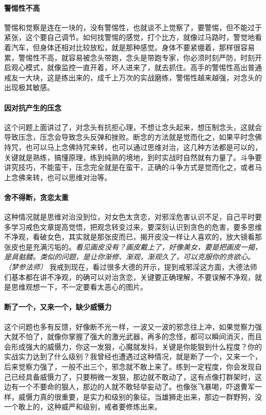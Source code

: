 \paragraph{警惕性不高}

警惕和觉察是连在一块的，没有警惕性，也就谈不上觉察了，要警惕，但不能过于紧张，这个要自己调节。如何找警惕的感觉，打个比方，就像过马路时，警觉地看着汽车，但身体还相对比较放松，就是那种感觉。身体不要紧绷着，那样很容易累，警惕性不高，就容易被念头带跑，念头是带跑专家，你必须时刻严防，时刻开启观心模式，就像监控一直开着，坏人进来了，就去抓住。高手的警惕性高出普通戒友一大块，这是练出来的，成千上万次的实战磨练，警惕性越来越强，对念头的出现极其敏感。

\paragraph{因对抗产生的压念}

这个问题上面讲过了，对念头有抗拒心理，不想让念头起来，想压制念头，这就会导致压念，压念会导致念头反弹和挫败。断念的方法就是觉而化之，如果平时念佛持咒，也可以马上念佛持咒来转，也可以通过思维对治，这几种方法都是可以的，关键就是熟练，搞懂原理，练到纯熟的境地，到时实战时自然就有力量了。斗争要讲究技巧，不能蛮干，压念完全就是在蛮干，正确的斗争方式是觉而化之，或者马上念佛来转，也可以思维对治等。

\paragraph{舍不得断，贪恋太重}

这种情况就是思维对治没到位，对女色太贪恋，对邪淫危害认识不足，自己平时要多学习戒色文章提高觉悟，把观念转变过来，要深刻认识到贪色的危害，要多思维不净观，看破女色，其实就是那张皮而已，揭开皮没一样让人喜欢的，放大镜看那张皮也是充满污垢的。\textit{看见画皮没有？画皮戴上了，好像美女，要是把画皮一揭，是具骷髅。类似的问题，是让你渐修、渐观，渐观久了，可以克服你的贪欲心。（梦参法师）} 我戒到现在，看过很多大德的开示，提到戒邪淫这方面，大德法师们基本都在讲不净观，的确可以对治贪恋，关键要正确理解，不要误解不净观，就是思维观想一下，不一定要看太恶心的图片。

\paragraph{断了一个，又来一个，缺少威慑力}

这个问题也多有反馈，好像断不光一样，一波又一波的邪念往上冲，如果觉察力强大就不怕了，就像你掌握了强大的激光武器，再多的念怪，都可以瞬间消灭，而且会形成强大的威慑力，你这一发狠，心魔就发抖，关键是你能狠到什么程度？你的实战实力达到了什么级别？我曾经也遭遇过这种情况，就是断了一个，又来一个，后来觉察力强了，一般不出三个，邪念就不敢上来了。练到一定程度，你会发现自己已经具备威慑力了，只要稍微一发狠，那边就不敢动了，这有点像打群架时，这边有一个不要命的狠人，那边的人就不敢轻举妄动了。也像张飞暴喝，吓退曹军一样，威慑力真的很重要，是实力和级别的象征。当雄狮走出来，那边一群野狗，没一个敢上的，这种威严和级别，戒者要修炼出来。

